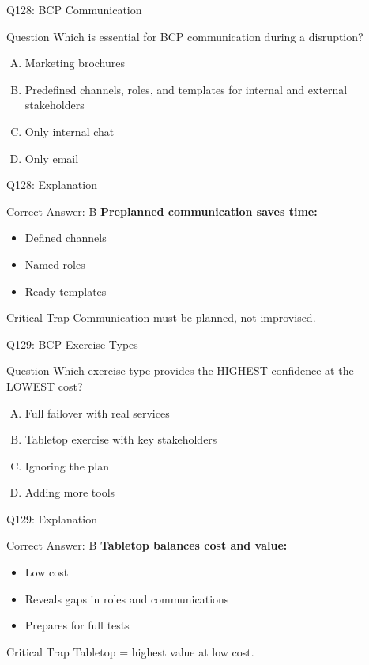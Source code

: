\documentclass{beamer}
\begin{document}
	\begin{frame}{Q128: BCP Communication}
		\begin{block}{Question}
			Which is essential for BCP communication during a disruption?
		\end{block}
		\begin{enumerate}[(A)]
			\item Marketing brochures
			\item Predefined channels, roles, and templates for internal and external stakeholders
			\item Only internal chat
			\item Only email
		\end{enumerate}
	\end{frame}
	
	\begin{frame}{Q128: Explanation}
		\begin{block}{Correct Answer: B}
			\textbf{Preplanned communication saves time:}
			\begin{itemize}
				\item Defined channels
				\item Named roles
				\item Ready templates
			\end{itemize}
		\end{block}
		\begin{alertblock}{Critical Trap}
			Communication must be planned, not improvised.
		\end{alertblock}
	\end{frame}
	
	\begin{frame}{Q129: BCP Exercise Types}
		\begin{block}{Question}
			Which exercise type provides the HIGHEST confidence at the LOWEST cost?
		\end{block}
		\begin{enumerate}[(A)]
			\item Full failover with real services
			\item Tabletop exercise with key stakeholders
			\item Ignoring the plan
			\item Adding more tools
		\end{enumerate}
	\end{frame}
	
	\begin{frame}{Q129: Explanation}
		\begin{block}{Correct Answer: B}
			\textbf{Tabletop balances cost and value:}
			\begin{itemize}
				\item Low cost
				\item Reveals gaps in roles and communications
				\item Prepares for full tests
			\end{itemize}
		\end{block}
		\begin{alertblock}{Critical Trap}
			Tabletop = highest value at low cost.
		\end{alertblock}
	\end{frame}
	
\end{document}
